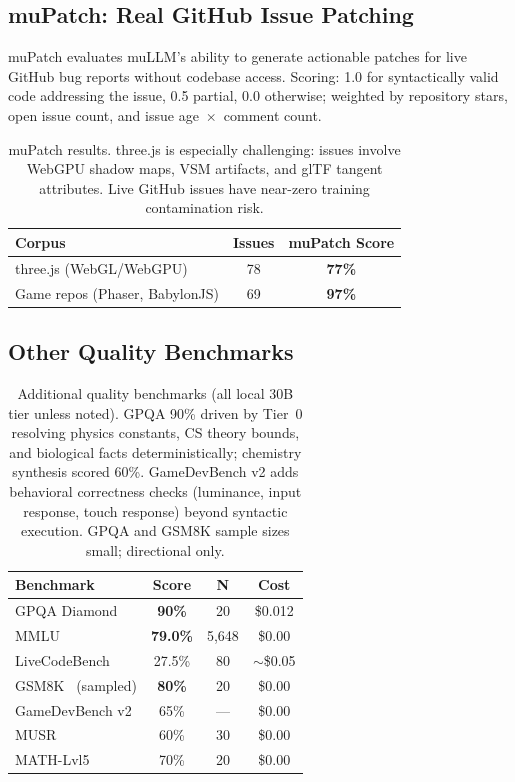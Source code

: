 \documentclass[11pt]{article}
\begin{document}
\subsection{muPatch: Real GitHub Issue Patching}

muPatch evaluates muLLM's ability to generate actionable patches for
live GitHub bug reports without codebase access. Scoring: 1.0 for
syntactically valid code addressing the issue, 0.5 partial, 0.0
otherwise; weighted by repository stars, open issue count, and issue
age~$\times$~comment count.

\begin{table}[t]
\centering
\small
\begin{tabular}{lcc}
\toprule
\textbf{Corpus} & \textbf{Issues} & \textbf{muPatch Score} \\
\midrule
three.js (WebGL/WebGPU) & 78 & \textbf{77\%} \\
Game repos (Phaser, BabylonJS) & 69 & \textbf{97\%} \\
\bottomrule
\end{tabular}
\caption{muPatch results. three.js is especially challenging: issues
involve WebGPU shadow maps, VSM artifacts, and glTF tangent attributes.
Live GitHub issues have near-zero training contamination risk.}
\label{tab:mupatch}
\end{table}

\subsection{Other Quality Benchmarks}

\begin{table}[t]
\centering
\small
\begin{tabular}{lccc}
\toprule
\textbf{Benchmark} & \textbf{Score} & \textbf{N} & \textbf{Cost} \\
\midrule
GPQA Diamond & \textbf{90\%} & 20 & \$0.012 \\
MMLU~\cite{hendrycks2021mmlu} & \textbf{79.0\%} & 5,648 & \$0.00 \\
LiveCodeBench & 27.5\% & 80 & $\sim$\$0.05 \\
GSM8K~\cite{cobbe2021gsm8k} (sampled) & \textbf{80\%} & 20 & \$0.00 \\
GameDevBench v2 & 65\% & --- & \$0.00 \\
MUSR & 60\% & 30 & \$0.00 \\
MATH-Lvl5 & 70\% & 20 & \$0.00 \\
\bottomrule
\end{tabular}
\caption{Additional quality benchmarks (all local 30B tier unless
noted). GPQA 90\% driven by Tier~0 resolving physics constants, CS
theory bounds, and biological facts deterministically; chemistry
synthesis scored 60\%. GameDevBench v2 adds behavioral correctness
checks (luminance, input response, touch response) beyond syntactic
execution. GPQA and GSM8K sample sizes small; directional only.}
\label{tab:otherbench}
\end{table}
\end{document}
